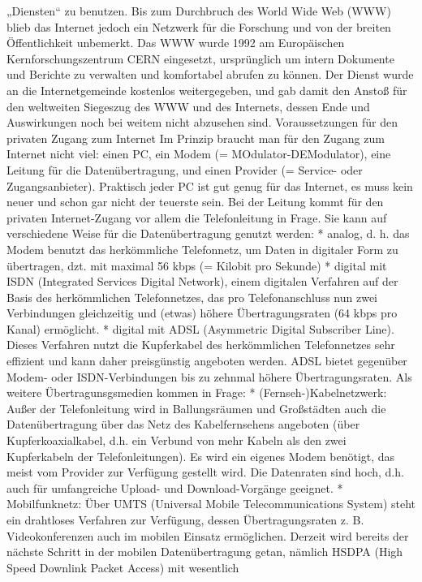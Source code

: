 \documentclass[]{book}
\theoremstyle{definition}
\theoremstyle{definition}
\theoremstyle{definition}
\theoremstyle{remark}
\begin{document}
„Diensten`` zu benutzen. Bis zum Durchbruch des World Wide Web (WWW)
blieb das Internet jedoch ein Netzwerk für die Forschung und von der
breiten Öffentlichkeit unbemerkt. Das WWW wurde 1992 am Europäischen
Kernforschungszentrum CERN eingesetzt, ursprünglich um intern Dokumente
und Berichte zu verwalten und komfortabel abrufen zu können. Der Dienst
wurde an die Internetgemeinde kostenlos weitergegeben, und gab damit den
Anstoß für den weltweiten Siegeszug des WWW und des Internets, dessen
Ende und Auswirkungen noch bei weitem nicht abzusehen sind.
Voraussetzungen für den privaten Zugang zum Internet Im Prinzip braucht
man für den Zugang zum Internet nicht viel: einen PC, ein Modem (=
MOdulator-DEModulator), eine Leitung für die Datenübertragung, und einen
Provider (= Service- oder Zugangsanbieter). Praktisch jeder PC ist gut
genug für das Internet, es muss kein neuer und schon gar nicht der
teuerste sein. Bei der Leitung kommt für den privaten Internet-Zugang
vor allem die Telefonleitung in Frage. Sie kann auf verschiedene Weise
für die Datenübertragung genutzt werden: * analog, d. h. das Modem
benutzt das herkömmliche Telefonnetz, um Daten in digitaler Form zu
übertragen, dzt. mit maximal 56 kbps (= Kilobit pro Sekunde) * digital
mit ISDN (Integrated Services Digital Network), einem digitalen
Verfahren auf der Basis des herkömmlichen Telefonnetzes, das pro
Telefonanschluss nun zwei Verbindungen gleichzeitig und (etwas) höhere
Übertragungsraten (64 kbps pro Kanal) ermöglicht. * digital mit ADSL
(Asymmetric Digital Subscriber Line). Dieses Verfahren nutzt die
Kupferkabel des herkömmlichen Telefonnetzes sehr effizient und kann
daher preisgünstig angeboten werden. ADSL bietet gegenüber Modem- oder
ISDN-Verbindungen bis zu zehnmal höhere Übertragungsraten. Als weitere
Übertragunsgsmedien kommen in Frage: * (Fernseh-)Kabelnetzwerk: Außer
der Telefonleitung wird in Ballungsräumen und Großstädten auch die
Datenübertragung über das Netz des Kabelfernsehens angeboten (über
Kupferkoaxialkabel, d.h. ein Verbund von mehr Kabeln als den zwei
Kupferkabeln der Telefonleitungen). Es wird ein eigenes Modem benötigt,
das meist vom Provider zur Verfügung gestellt wird. Die Datenraten sind
hoch, d.h. auch für umfangreiche Upload- und Download-Vorgänge geeignet.
* Mobilfunknetz: Über UMTS (Universal Mobile Telecommunications System)
steht ein drahtloses Verfahren zur Verfügung, dessen Übertragungsraten
z. B. Videokonferenzen auch im mobilen Einsatz ermöglichen. Derzeit wird
bereits der nächste Schritt in der mobilen Datenübertragung getan,
nämlich HSDPA (High Speed Downlink Packet Access) mit wesentlich
\end{document}
